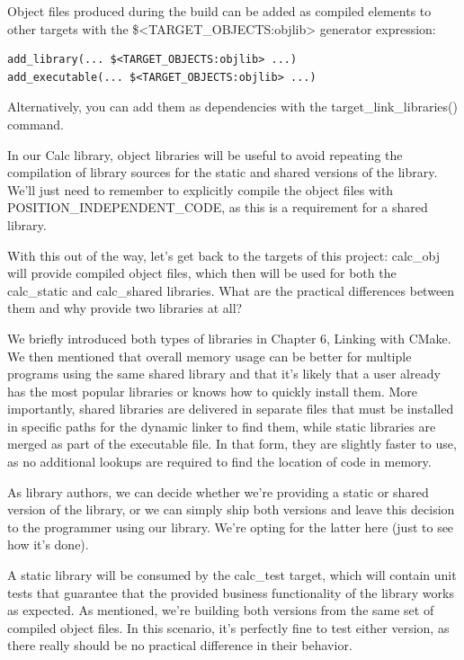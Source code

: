 Object files produced during the build can be added as compiled elements to other targets with the \$<TARGET\_OBJECTS:objlib> generator expression:

\begin{lstlisting}[style=styleCMake]
add_library(... $<TARGET_OBJECTS:objlib> ...)
add_executable(... $<TARGET_OBJECTS:objlib> ...)
\end{lstlisting}

Alternatively, you can add them as dependencies with the target\_link\_libraries() command.

In our Calc library, object libraries will be useful to avoid repeating the compilation of library sources for the static and shared versions of the library. We'll just need to remember to explicitly compile the object files with POSITION\_INDEPENDENT\_CODE, as this is a requirement for a shared library.

With this out of the way, let's get back to the targets of this project: calc\_obj will provide compiled object files, which then will be used for both the calc\_static and calc\_shared libraries. What are the practical differences between them and why provide two libraries at all?


We briefly introduced both types of libraries in Chapter 6, Linking with CMake. We then mentioned that overall memory usage can be better for multiple programs using the same shared library and that it's likely that a user already has the most popular libraries or knows how to quickly install them. More importantly, shared libraries are delivered in separate files that must be installed in specific paths for the dynamic linker to find them, while static libraries are merged as part of the executable file. In that form, they are slightly faster to use, as no additional lookups are required to find the location of code in memory.

As library authors, we can decide whether we're providing a static or shared version of the library, or we can simply ship both versions and leave this decision to the programmer using our library. We're opting for the latter here (just to see how it's done).

A static library will be consumed by the calc\_test target, which will contain unit tests that guarantee that the provided business functionality of the library works as expected. As mentioned, we're building both versions from the same set of compiled object files. In this scenario, it's perfectly fine to test either version, as there really should be no practical difference in their behavior.

